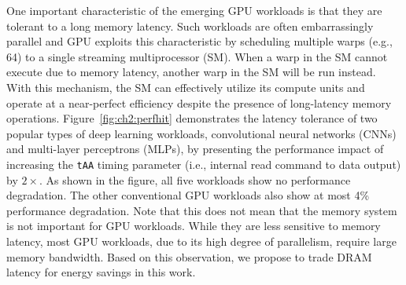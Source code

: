 One important characteristic of the emerging GPU workloads is that they are tolerant to a long memory latency. Such workloads are often embarrassingly parallel and GPU exploits this characteristic by scheduling multiple warps (e.g., 64) to a single streaming multiprocessor (SM). When a warp in the SM cannot execute due to memory latency, another warp in the SM will be run instead. With this mechanism, the SM can effectively utilize its compute units and operate at a near-perfect efficiency despite the presence of long-latency memory operations. Figure~\ref{fig:ch2:perfhit} demonstrates the latency tolerance of two popular types of deep learning workloads, convolutional neural networks (CNNs) and multi-layer perceptrons (MLPs), by presenting the performance impact of increasing the {\tt tAA} timing parameter (i.e., internal read command to data output) by $2\times$. As shown in the figure, all five workloads show no performance degradation. The other conventional GPU workloads also show at most 4\% performance degradation. Note that this does not mean that the memory system is not important for GPU workloads. While they are less sensitive to memory latency, most GPU workloads, due to its high degree of parallelism, require large memory bandwidth. Based on this observation, we propose to trade DRAM latency for energy savings in this work.




